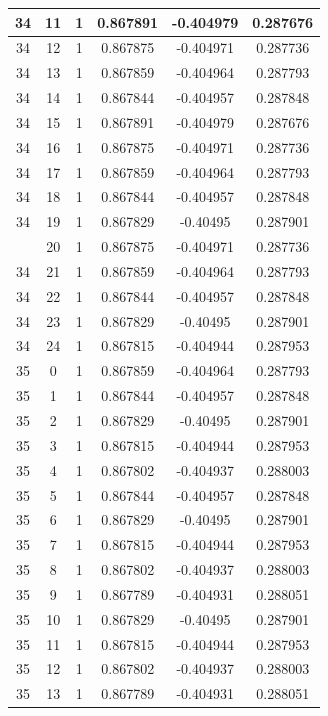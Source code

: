 \documentclass[12pt,a4paper]{article}
\numberwithin{equation}{section}
\numberwithin{figure}{section}
\numberwithin{table}{section}
\begin{document}
\begin{longtable}{|c|c|c|c|c|c|}
34 & 11 & 1 & 0.867891 & -0.404979 & 0.287676 \\ \hline
34 & 12 & 1 & 0.867875 & -0.404971 & 0.287736 \\ \hline
34 & 13 & 1 & 0.867859 & -0.404964 & 0.287793 \\ \hline
34 & 14 & 1 & 0.867844 & -0.404957 & 0.287848 \\ \hline
34 & 15 & 1 & 0.867891 & -0.404979 & 0.287676 \\ \hline
34 & 16 & 1 & 0.867875 & -0.404971 & 0.287736 \\ \hline
34 & 17 & 1 & 0.867859 & -0.404964 & 0.287793 \\ \hline
34 & 18 & 1 & 0.867844 & -0.404957 & 0.287848 \\ \hline
34 & 19 & 1 & 0.867829 & -0.40495 & 0.287901 \\ \hline
\pagebreak
34 & 20 & 1 & 0.867875 & -0.404971 & 0.287736 \\ \hline
34 & 21 & 1 & 0.867859 & -0.404964 & 0.287793 \\ \hline
34 & 22 & 1 & 0.867844 & -0.404957 & 0.287848 \\ \hline
34 & 23 & 1 & 0.867829 & -0.40495 & 0.287901 \\ \hline
34 & 24 & 1 & 0.867815 & -0.404944 & 0.287953 \\ \hline
35 & 0 & 1 & 0.867859 & -0.404964 & 0.287793 \\ \hline
35 & 1 & 1 & 0.867844 & -0.404957 & 0.287848 \\ \hline
35 & 2 & 1 & 0.867829 & -0.40495 & 0.287901 \\ \hline
35 & 3 & 1 & 0.867815 & -0.404944 & 0.287953 \\ \hline
35 & 4 & 1 & 0.867802 & -0.404937 & 0.288003 \\ \hline
35 & 5 & 1 & 0.867844 & -0.404957 & 0.287848 \\ \hline
35 & 6 & 1 & 0.867829 & -0.40495 & 0.287901 \\ \hline
35 & 7 & 1 & 0.867815 & -0.404944 & 0.287953 \\ \hline
35 & 8 & 1 & 0.867802 & -0.404937 & 0.288003 \\ \hline
35 & 9 & 1 & 0.867789 & -0.404931 & 0.288051 \\ \hline
35 & 10 & 1 & 0.867829 & -0.40495 & 0.287901 \\ \hline
35 & 11 & 1 & 0.867815 & -0.404944 & 0.287953 \\ \hline
35 & 12 & 1 & 0.867802 & -0.404937 & 0.288003 \\ \hline
35 & 13 & 1 & 0.867789 & -0.404931 & 0.288051 \\ \hline

\end{longtable}
\end{document}

